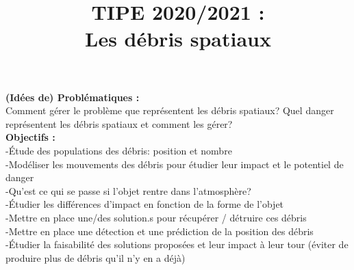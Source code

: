\documentclass[a4paper,1pt]{article}
\title{TIPE 2020/2021 : \\ Les débris spatiaux}
\date{}
\begin{document}
\maketitle
\textbf{ (Idées de) Problématiques :}
\\
Comment gérer le problème que représentent les débris spatiaux?
Quel danger représentent les débris spatiaux et comment les gérer? 
\\

\textbf{Objectifs :}
\\
-Étude des populations des débris: position et nombre
\\
-Modéliser les mouvements des débris pour étudier leur impact et le potentiel de danger
\\
-Qu'est ce qui se passe si l'objet rentre dans l'atmosphère?
\\
-Étudier les différences d'impact en fonction de la forme de l'objet
\\
-Mettre en place une/des solution.s pour récupérer / détruire ces débris
\\
-Mettre en place une détection et une prédiction de la position des débris
\\
-Étudier la faisabilité des solutions proposées et leur impact à leur tour (éviter de produire plus de débris qu'il n'y en a déjà)
\end{document}
